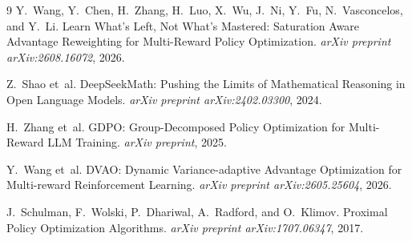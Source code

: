 \documentclass[11pt,a4paper]{article}
\begin{document}
\begin{thebibliography}{9}
Y.~Wang, Y.~Chen, H.~Zhang, H.~Luo, X.~Wu, J.~Ni, Y.~Fu, N.~Vasconcelos, and Y.~Li.
\newblock Learn What's Left, Not What's Mastered: Saturation Aware Advantage Reweighting for Multi-Reward Policy Optimization.
\newblock \emph{arXiv preprint arXiv:2608.16072}, 2026.

Z.~Shao et~al.
\newblock DeepSeekMath: Pushing the Limits of Mathematical Reasoning in Open Language Models.
\newblock \emph{arXiv preprint arXiv:2402.03300}, 2024.

H.~Zhang et~al.
\newblock GDPO: Group-Decomposed Policy Optimization for Multi-Reward LLM Training.
\newblock \emph{arXiv preprint}, 2025.

Y.~Wang et~al.
\newblock DVAO: Dynamic Variance-adaptive Advantage Optimization for Multi-reward Reinforcement Learning.
\newblock \emph{arXiv preprint arXiv:2605.25604}, 2026.

J.~Schulman, F.~Wolski, P.~Dhariwal, A.~Radford, and O.~Klimov.
\newblock Proximal Policy Optimization Algorithms.
\newblock \emph{arXiv preprint arXiv:1707.06347}, 2017.
\end{thebibliography}
\end{document}
